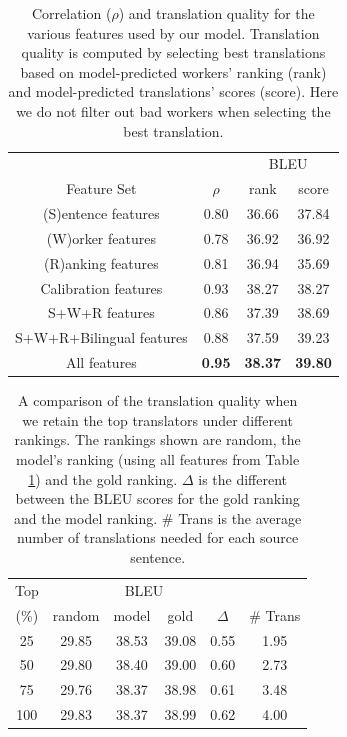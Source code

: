 \documentclass[11pt,letterpaper]{article}
\begin{document}
\begin{table}[htbp]
 \center
\begin{tabular}{c|c|cc}
\hline
 & & \multicolumn{2}{c}{BLEU}\\
Feature Set             & $\rho$  & rank & score    \\ \hhline{====}
(S)entence features     & 0.80 & 36.66 &37.84 \\
(W)orker features       & 0.78 & 36.92 &36.92 \\
(R)anking features      & 0.81 & 36.94 &35.69\\
Calibration features  & 0.93 & 38.27 &38.27\\
S+W+R features          & 0.86 & 37.39 & 38.69\\
S+W+R+Bilingual features        & 0.88 & 37.59 &39.23 \\
All features            & \textbf{0.95} & \textbf{38.37} & \textbf{39.80}\\ \hline
\end{tabular}
\caption{\label{lrresult} Correlation ($\rho$) and translation quality for the various features used by our model.  Translation quality is computed by selecting best translations based on model-predicted workers' ranking (rank) and model-predicted translations' scores (score). Here we do not filter out bad workers when selecting the best translation.}
\end{table}



\begin{table}[htbp]
\center
\begin{tabular}{c|ccccc}
\hline
Top & \multicolumn{4}{c}{BLEU}&\\
 (\%) &random & model & gold & $\Delta$ & \# Trans\\\hhline{======}
25      &29.85& 38.53   & 39.08      & 0.55   & 1.95         \\
50      &29.80& 38.40   & 39.00      & 0.60   & 2.73         \\
75      &29.76& 38.37   & 38.98      & 0.61   & 3.48         \\
100     &29.83& 38.37   & 38.99      & 0.62   & 4.00         \\ \hline
\end{tabular}
\caption{\label{modeltoprank} A comparison of the translation quality when we retain the top translators under different rankings.  The rankings shown are random, the model's ranking (using all features from Table \ref{lrresult}) and the gold ranking.  $\Delta$ is the different between the BLEU scores for the gold ranking and the model ranking. \# Trans is the average number of translations needed for each source sentence. 
}
\end{table} 
\end{document}
